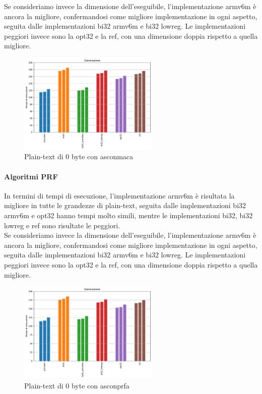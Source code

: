\documentclass[12pt,a4paper,italian]{report}
\begin{document}
\noindent Se consideriamo invece la dimensione dell'eseguibile, l'implementazione armv6m è ancora la migliore, confermandosi come migliore implementazione in ogni aspetto, seguita dalle implementazioni bi32 armv6m e bi32 lowreg. Le implementazioni peggiori invece sono la opt32 e la ref, con una dimensione doppia rispetto a quella migliore.

\begin{figure}[H]
    \centering
    \includegraphics[width=0.6\textwidth]{adafruit/asconmaca.pdf}
    \caption{Plain-text di 0 byte con asconmaca}
\end{figure}

\paragraph{Algoritmi PRF}

In termini di tempi di esecuzione, l'implementazione armv6m è risultata la migliore in tutte le grandezze di plain-text, seguita dalle implementazioni bi32 armv6m e opt32 hanno tempi molto simili, mentre le implementazioni bi32, bi32 lowreg e ref sono risultate le peggiori. \\

\noindent Se consideriamo invece la dimensione dell'eseguibile, l'implementazione armv6m è ancora la migliore, confermandosi come migliore implementazione in ogni aspetto, seguita dalle implementazioni bi32 armv6m e bi32 lowreg. Le implementazioni peggiori invece sono la opt32 e la ref, con una dimensione doppia rispetto a quella migliore.

\begin{figure}[H]
    \centering
    \includegraphics[width=0.6\textwidth]{adafruit/asconprfa.pdf}
    \caption{Plain-text di 0 byte con asconprfa}
\end{figure}
\end{document}
